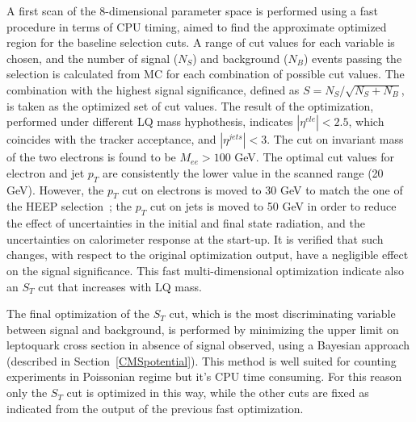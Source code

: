 A first scan of the 8-dimensional parameter space is performed using a fast procedure in terms of CPU timing, 
aimed to find the approximate optimized region for the baseline selection cuts.
A range of cut values for each variable is chosen, and the number of signal ($N_S$) 
and background ($N_B$) events passing the selection is calculated from MC for each combination 
of possible cut values. The combination with the highest signal significance, 
defined as $S = N_S/\sqrt{N_S+N_B}$, is taken as the optimized set of cut values. %
The result of the optimization, performed under different LQ mass hyphothesis, 
indicates $|\eta^{ele}|<2.5$, which coincides with the tracker acceptance,
and $|\eta^{jets}|<3$. The cut on invariant mass of the two electrons is found to be $M_{ee}>100$ GeV. The 
optimal cut values for electron and jet $p_T$ are consistently the lower value in the scanned range 
(20 GeV). However, the $p_{T}$ cut on electrons is moved to 30 GeV to match the one of the HEEP 
selection~\cite{HEEPNOTE}; %
the $p_{T}$ cut on jets is moved to 50 GeV in order to reduce the effect 
of uncertainties in the initial and final state radiation, and the uncertainties 
on calorimeter response at the start-up. It is verified that such changes, with respect to the original 
optimization output, have a negligible effect on the signal significance. 
This fast multi-dimensional optimization indicate also an $S_T$ cut 
that increases with LQ mass. 

The final optimization of the $S_T$ cut, which is the most discriminating variable between signal and background, 
is performed by minimizing the upper limit on leptoquark cross section in absence of signal observed, 
using a Bayesian approach (described in Section~\ref{CMSpotential}). 
This method is well suited for counting experiments in Poissonian regime but it's CPU time consuming. 
For this reason only the $S_T$ cut is optimized in this way, while the other cuts are fixed as indicated from 
the output of the previous fast optimization.

